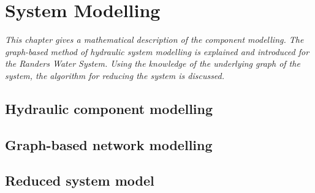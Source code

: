 \chapter{System Modelling}
\label{system_modelling}

\emph{This chapter gives a mathematical description of the component modelling. The graph-based method of hydraulic system modelling is explained and introduced for the Randers Water System. Using the knowledge of the underlying graph of the system, the algorithm for reducing the system is discussed.}

\section{Hydraulic component modelling}

\section{Graph-based network modelling}

\section{Reduced system model}